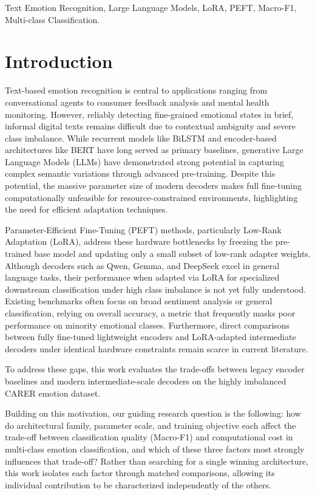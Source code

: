 \documentclass[conference]{IEEEtran}
\begin{document}
\begin{IEEEkeywords}
Text Emotion Recognition, Large Language Models, LoRA, PEFT, Macro-F1, Multi-class Classification.
\end{IEEEkeywords}

\section{Introduction}
Text-based emotion recognition is central to applications ranging from conversational agents to consumer feedback analysis and mental health monitoring. 
However, reliably detecting fine-grained emotional states in brief, informal digital texts remains difficult due to contextual ambiguity and severe 
class imbalance. While recurrent models like BiLSTM and encoder-based architectures like BERT have long served as primary baselines, generative 
Large Language Models (LLMs) have demonstrated strong potential in capturing complex semantic variations through advanced pre-training. Despite this 
potential, the massive parameter size of modern decoders makes full fine-tuning computationally unfeasible for resource-constrained environments, 
highlighting the need for efficient adaptation techniques.

Parameter-Efficient Fine-Tuning (PEFT) methods, particularly Low-Rank Adaptation (LoRA), address these hardware bottlenecks by freezing the 
pre-trained base model and updating only a small subset of low-rank adapter weights. Although decoders such as Qwen, Gemma, and DeepSeek excel 
in general language tasks, their performance when adapted via LoRA for specialized downstream classification under high class imbalance is not 
yet fully understood. Existing benchmarks often focus on broad sentiment analysis or general classification, relying on overall accuracy, a metric 
that frequently masks poor performance on minority emotional classes. Furthermore, direct comparisons between fully fine-tuned lightweight encoders 
and LoRA-adapted intermediate decoders under identical hardware constraints remain scarce in current literature.

To address these gaps, this work evaluates the trade-offs between legacy encoder baselines and modern intermediate-scale decoders on the highly 
imbalanced CARER emotion dataset.

Building on this motivation, our guiding research question is the following: how do architectural family, parameter scale, and training objective each affect the trade-off between classification quality (Macro-F1) and computational cost in multi-class emotion classification, and which of these three factors most strongly influences that trade-off? Rather than searching for a single winning architecture, this work isolates each factor through matched comparisons, allowing its individual contribution to be characterized independently of the others.
\end{document}
